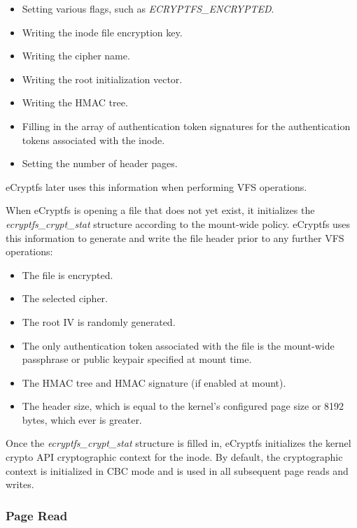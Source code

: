 \documentclass{article}
\begin{document}
\begin{itemize}
\item{Setting various flags, such as \emph{ECRYPTFS\_ENCRYPTED}.}
\item{Writing the inode file encryption key.}
\item{Writing the cipher name.}
\item{Writing the root initialization vector.}
\item{Writing the HMAC tree.}
\item{Filling in the array of authentication token signatures for the
  authentication tokens associated with the inode.}
\item{Setting the number of header pages.}
\end{itemize}

eCryptfs later uses this information when performing VFS operations.

When eCryptfs is opening a file that does not yet exist, it
initializes the \emph{ecryptfs\_crypt\_stat} structure according to
the mount-wide policy. eCryptfs uses this information to generate and
write the file header prior to any further VFS operations:

\begin{itemize}
\item{The file is encrypted.}
\item{The selected cipher.}
\item{The root IV is randomly generated.}
\item{The only authentication token associated with the file is the
  mount-wide passphrase or public keypair specified at mount time.}
\item{The HMAC tree and HMAC signature (if enabled at mount).}
\item{The header size, which is equal to the kernel's configured
  page size or 8192 bytes, which ever is greater.}
\end{itemize}

Once the \emph{ecryptfs\_crypt\_stat} structure is filled in, eCryptfs
initializes the kernel crypto API cryptographic context for the inode.
By default, the cryptographic context is initialized in CBC mode and
is used in all subsequent page reads and writes.

\subsubsection{Page Read}
\end{document}
